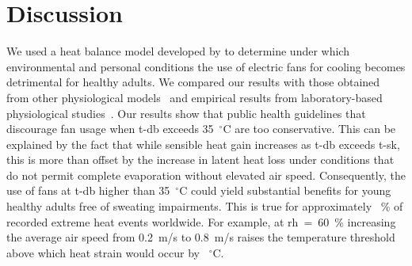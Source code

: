 
\section{Discussion}\label{sec:discussion}

We used a heat balance model developed by  to determine under which environmental and personal conditions the use of electric fans for cooling becomes detrimental for healthy adults.
We compared our results with those obtained from other physiological models~\cite{Jay2015, iso7933} and empirical results from laboratory-based physiological studies~\cite{Rate2015, Morris2019}.
Our results show that public health guidelines that discourage fan usage when \ac{t-db} exceeds 35~$^{\circ}$C are too conservative.
This can be explained by the fact that while sensible heat gain increases as \ac{t-db} exceeds \ac{t-sk}, this is more than offset by the increase in latent heat loss under conditions that do not permit complete evaporation without elevated air speed.
Consequently, the use of fans at \ac{t-db} higher than 35~$^{\circ}$C could yield substantial benefits for young healthy adults free of sweating impairments.
This is true for approximately ~\% of recorded extreme heat events worldwide.
For example, at \ac{rh}~=~60~\% increasing the average air speed from 0.2~m/s to 0.8~m/s raises the temperature threshold above which heat strain would occur by ~$^{\circ}$C.\@

